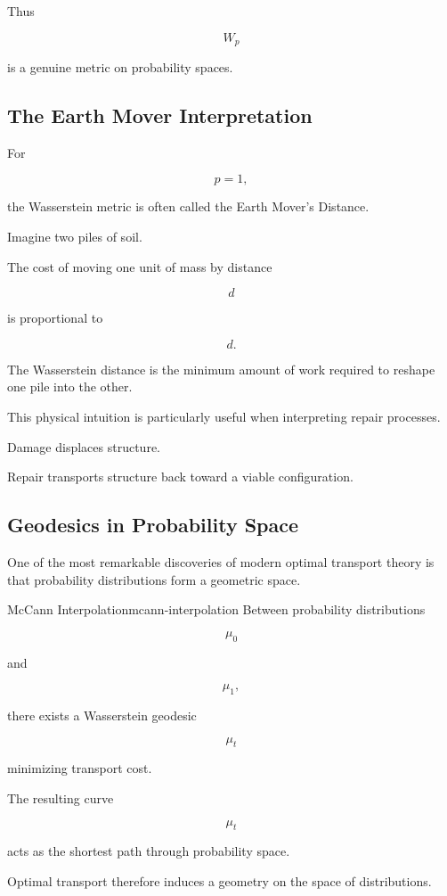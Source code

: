 \documentclass[12pt,twoside,openright]{book}
\begin{document}
Thus

\[
W_p
\]

is a genuine metric on probability spaces.

\subsection{The Earth Mover Interpretation}

For

\[
p=1,
\]

the Wasserstein metric is often called the Earth Mover's
Distance.

Imagine two piles of soil.

The cost of moving one unit of mass by distance

\[
d
\]

is proportional to

\[
d.
\]

The Wasserstein distance is the minimum amount of work
required to reshape one pile into the other.

This physical intuition is particularly useful when
interpreting repair processes.

Damage displaces structure.

Repair transports structure back toward a viable
configuration.

\subsection{Geodesics in Probability Space}

One of the most remarkable discoveries of modern optimal
transport theory is that probability distributions form a
geometric space.

\begin{theorem}{McCann Interpolation}{mcann-interpolation}
Between probability distributions

\[
\mu_0
\]

and

\[
\mu_1,
\]

there exists a Wasserstein geodesic

\[
\mu_t
\]

minimizing transport cost.
\end{theorem}

The resulting curve

\[
\mu_t
\]

acts as the shortest path through probability space.

Optimal transport therefore induces a geometry on the
space of distributions.
\end{document}
